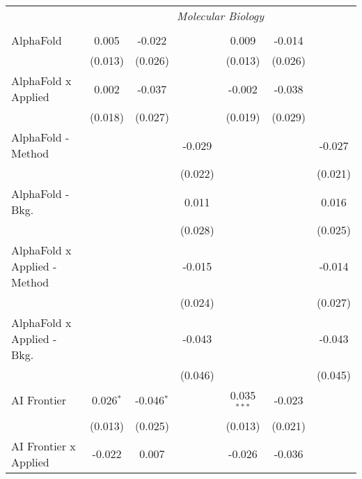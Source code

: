 \begin{tabular}{lcccccc}
 & \multicolumn{6}{c}{\textit{Molecular Biology}} \\ \\
   AlphaFold                      & 0.005       & -0.022        &                & 0.009         & -0.014        &   \\   
                                  & (0.013)     & (0.026)       &                & (0.013)       & (0.026)       &   \\   
   AlphaFold x Applied            & 0.002       & -0.037        &                & -0.002        & -0.038        &   \\   
                                  & (0.018)     & (0.027)       &                & (0.019)       & (0.029)       &   \\   
   AlphaFold - Method             &             &               & -0.029         &               &               & -0.027\\   
                                  &             &               & (0.022)        &               &               & (0.021)\\   
   AlphaFold - Bkg.               &             &               & 0.011          &               &               & 0.016\\   
                                  &             &               & (0.028)        &               &               & (0.025)\\   
   AlphaFold x Applied - Method   &             &               & -0.015         &               &               & -0.014\\   
                                  &             &               & (0.024)        &               &               & (0.027)\\   
   AlphaFold x Applied - Bkg.     &             &               & -0.043         &               &               & -0.043\\   
                                  &             &               & (0.046)        &               &               & (0.045)\\   
   AI Frontier                    & 0.026$^{*}$ & -0.046$^{*}$  &                & 0.035$^{***}$ & -0.023        &   \\   
                                  & (0.013)     & (0.025)       &                & (0.013)       & (0.021)       &   \\   
   AI Frontier x Applied          & -0.022      & 0.007         &                & -0.026        & -0.036        &   \\   

\end{tabular}
